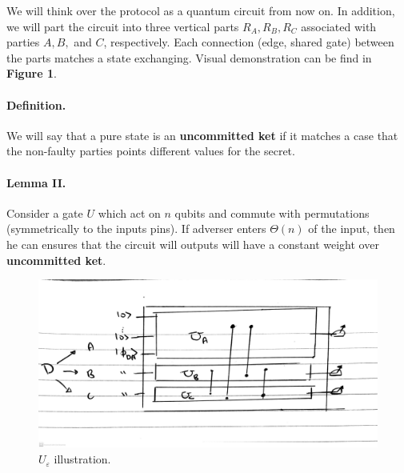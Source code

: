 \documentclass{article}
\begin{document}
We will think over the protocol as a quantum circuit from now on. 
In addition, we will part the circuit into three vertical parts \(R_{A}, R_{B}, R_{C}\) associated with parties \(A, B,\) and \(C\), respectively. Each connection (edge, shared gate) between the parts matches a state exchanging. Visual demonstration can be find in \textbf{Figure 1}.   



\paragraph{Definition.} We will say that a pure state is an \textbf{uncommitted ket} if it matches a case that the non-faulty parties points different values for the secret.  

\paragraph{Lemma II.} Consider a gate \(U\) which act on \(n\) qubits and commute with permutations (symmetrically to the inputs pins). If adverser enters \(\Theta\left(n\right)\) of the input, then he can ensures that the circuit will outputs will have a constant weight over \textbf{uncommitted ket}.  


\begin{figure}[H]
\includegraphics[scale=0.17]{images/avss protocol - Page 2.jpg}
\caption{ \(U_{\varepsilon}\) illustration. }
    \label{fig:simulation_cases}
\end{figure}
\end{document}
